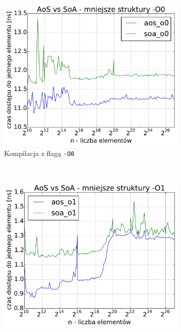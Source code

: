\begin{figure}
    \centering
    \begin{subfigure}[c]{0.45\textwidth}
        \centering
        \includegraphics[width=\textwidth]{images/benchs_xeon/compact_aos_vs_soa_O0}
        \caption{Kompilacja z flagą \texttt{-O0}}
    \end{subfigure}
    ~
    \begin{subfigure}[c]{0.45\textwidth}
        \centering
        \includegraphics[width=\textwidth]{images/benchs_xeon/compact_aos_vs_soa_O1}

\end{subfigure}
\end{figure}
